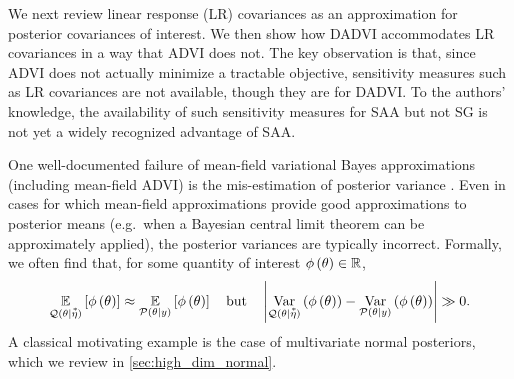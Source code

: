 We next review linear response (LR) covariances as an approximation for
posterior covariances of interest. We then show how DADVI accommodates LR
covariances in a way that ADVI does not. The key observation is that, since ADVI
does not actually minimize a tractable objective, sensitivity measures such as
LR covariances are not available, though they are for DADVI. To the authors'
knowledge, the availability of such sensitivity measures for SAA but not SG is
not yet a widely recognized advantage of SAA.

One well-documented failure of mean-field variational Bayes approximations
(including mean-field ADVI) is the mis-estimation of posterior variance
\citep{bishop:2006:pattern, turner:2011:two, giordano:2018:covariances,
margossian:2023:shrinkage}.  Even in cases for which mean-field approximations
provide good approximations to posterior means (e.g.\ when a Bayesian central
limit theorem can be approximately applied), the posterior variances are
typically incorrect. Formally, we often find that, for some quantity of interest
$\phi\left(\theta\right) \in \mathbb{R}$,
%
\begin{align}\label{eq:mfvb_conceit}
%
\expect{\q(\theta \vert \etastar)}{\qoi{\theta}} \approx
\expect{\post}{\qoi{\theta}} \quad\textrm{but}\quad
\abs{\var{\q(\theta \vert \etastar)}{\qoi{\theta}} - 
\var{\post}{\qoi{\theta}}} \gg 0.
\end{align}
%
A classical motivating example is the case of multivariate normal
posteriors, which we review in \cref{sec:high_dim_normal}.

